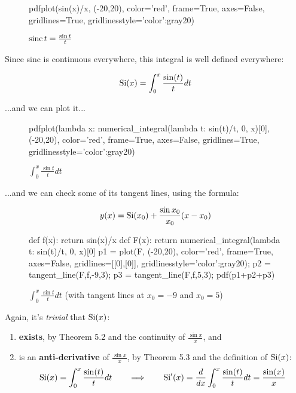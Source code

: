 \begin{figure}[H]
\begin{center}
\begin{sagecode}
pdfplot(sin(x)/x, (-20,20), color='red', frame=True, axes=False, gridlines=True, gridlinesstyle={'color':gray20})
\end{sagecode}
\end{center}
\caption{${\rm sinc\,} t = \frac{\sin t}{t}$}
\end{figure}

Since sinc is continuous everywhere, this integral is well defined everywhere:

$${\rm Si}(x) = \int_0^x \frac{\sin(t)}{t} dt$$

...and we can plot it...

\begin{figure}[H]
\begin{center}
\begin{sagecode}
pdfplot(lambda x: numerical_integral(lambda t: sin(t)/t, 0, x)[0], (-20,20), color='red', frame=True, axes=False, gridlines=True, gridlinesstyle={'color':gray20})
\end{sagecode}
\end{center}
\caption{$\int_0^x \frac{\sin t}{t} dt$}
\end{figure}

...and we can check some of its tangent lines, using the formula:

$$ y(x) = {\rm Si}(x_0) + \frac{\sin x_0}{x_0}(x-x_0)$$

\begin{figure}[H]
\begin{center}
\begin{sagecode}
def f(x):
    return sin(x)/x
def F(x):
   return numerical_integral(lambda t: sin(t)/t, 0, x)[0]
p1 = plot(F, (-20,20), color='red', frame=True, axes=False, gridlines=[[0],[0]], gridlinesstyle={'color':gray20});
p2 = tangent_line(F,f,-9,3);
p3 = tangent_line(F,f,5,3);
pdf(p1+p2+p3)
\end{sagecode}
\end{center}
\caption{$\int_0^x \frac{\sin t}{t} dt$ (with tangent lines at $x_0=-9$ and $x_0=5$)}
\end{figure}

Again, it's {\it trivial} that ${\rm Si}(x)$:

\begin{enumerate}
\item {\bf exists}, by \cite{briggs} Theorem 5.2 and the continuity of $\frac{\sin x}{x}$, and
\item is an {\bf anti-derivative} of $\frac{\sin x}{x}$, by \cite{briggs} Theorem 5.3 and the definition of ${\rm Si}(x)$:
$${\rm Si}(x) = \int_0^x \frac{\sin(t)}{t} dt \qquad\Longrightarrow\qquad {\rm Si}'(x) = \frac{d}{dx}\int_0^x \frac{\sin(t)}{t} dt = \frac{\sin(x)}{x}$$
\end{enumerate}

